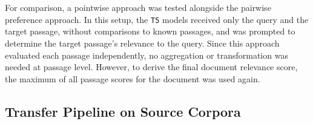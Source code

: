 \\\\
For comparison, a pointwise approach was tested alongside the pairwise preference approach. In this setup, the \texttt{T5} models received only the query and the target passage, without comparisons to known passages, and was prompted to determine the target passage's relevance to the query. Since this approach evaluated each passage independently, no aggregation or transformation was needed at passage level. However, to derive the final document relevance score, the maximum of all passage scores for the document was used again.

\subsection{Transfer Pipeline on Source Corpora}\label{eval-pairwise-preferences-source}

